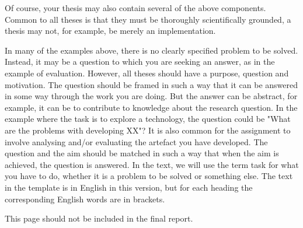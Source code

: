 Of course, your thesis may also contain several of the above components. 
Common to all theses is that they must be thoroughly scientifically grounded, a thesis may not, for example, be merely an implementation.

In many of the examples above, there is no clearly specified problem to be solved. 
Instead, it may be a question to which you are seeking an answer, as in the example of evaluation.
However, all theses should have a purpose, question and motivation. 
The question should be framed in such a way that it can be answered in some way through the work you are doing.
But the answer can be abstract, for example, it can be to contribute to knowledge about the research question.
In the example where the task is to explore a technology, the question could be "What are the problems with developing XX"?
It is also common for the assignment to involve analysing and/or evaluating the artefact you have developed.
The question and the aim should be matched in such a way that when the aim is achieved, the question is answered.
In the text, we will use the term task for what you have to do, whether it is a problem to be solved or something else.
The text in the template is in English in this version, but for each heading the corresponding English words are in brackets.

This page should not be included in the final report.
\newpage